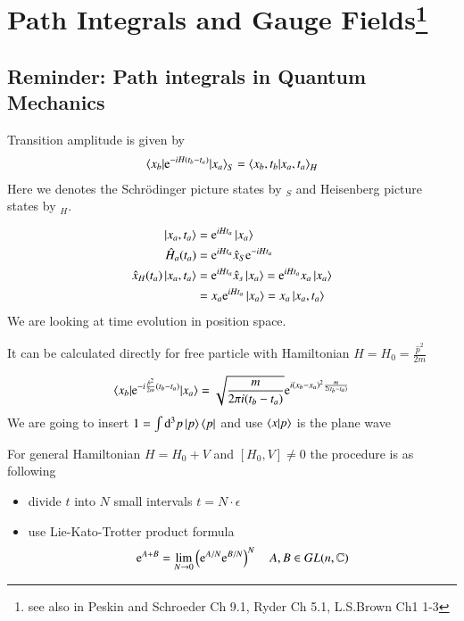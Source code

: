\chapter[Path Integrals and Gauge Fields]{Path Integrals and Gauge Fields\footnote{see also in  Peskin and Schroeder Ch 9.1,  Ryder Ch 5.1, L.S.Brown Ch1 1-3}}

\section{Reminder: Path integrals in Quantum Mechanics}
Transition amplitude is given by 
\begin{align}
   \braket{x_b | \mathrm{e}^{-iH(t_b - t_a)} | x_a}_{S} = \braket{x_b, t_b | x_a, t_a}_{H} 
\end{align}
Here we denotes the Schrödinger picture states by ${}_S$ and Heisenberg picture states by ${}_H$.

\begin{align}
   \ket{x_a, t_a} &= \mathrm{e}^{iHt_a} \ket{x_a} \\
   \hat{H}_a (t_a) &= \mathrm{e}^{iHt_a} \hat{x}_S \mathrm{e}^{-iHt_a} \\
   \hat{x}_H(t_a) \ket{x_a, t_a} &= \mathrm{e}^{iHt_a} \hat{x}_s \ket{x_a} = \mathrm{e}^{iHt_a} x_a \ket{x_a}  \notag\\
                                 &= x_a \mathrm{e}^{iHt_a} \ket{x_a} = x_a \ket{x_a, t_a}
\end{align}
We are looking at time evolution in position space.

It can be calculated directly for free particle with Hamiltonian $H = H_0 = \frac{\hat{p}^2}{2m}$

\begin{align}
   \braket{x_b | \mathrm{e}^{-i \frac{\hat{p}^2}{2m}(t_b - t_a)} | x_a} = \sqrt{\frac{m}{2\pi i (t_b - t_a)}} \mathrm{e}^{i(x_b - x_a)^2 \frac{m}{2(t_b - t_a)}}
\end{align}
We are going to insert $1 = \int \dd[3]{p} \ket{p}\bra{p}$ and use $\braket{x | p}$ is the plane wave

For general Hamiltonian $H = H_0 + V$ and $ \left[ H_0, V \right] \neq 0 $ the procedure is as following
\begin{itemize}
   \item divide $t$ into $N$ small intervals $t = N\cdot \epsilon$
   \item use Lie-Kato-Trotter product formula
      \begin{align}
         \mathrm{e}^{A+B} = \lim_{N \rightarrow 0} \left( \mathrm{e}^{A/N} \mathrm{e}^{B/N} \right)^N \quad A, B \in GL(n, \mathbb{C})
      \end{align}
\end{itemize}

